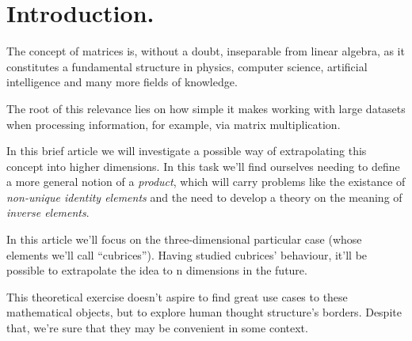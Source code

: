 \section{Introduction.} \label{intro}

The concept of matrices is, without a doubt, inseparable from linear algebra, as it constitutes a fundamental structure in physics, computer science, artificial intelligence and many more fields of knowledge.

The root of this relevance lies on how simple it makes working with large datasets when processing information, for example, via matrix multiplication.

In this brief article we will investigate a possible way of extrapolating this concept into higher dimensions. In this task we'll find ourselves needing to define a more general notion of a \textit{product}, which will carry problems like the existance of \textit{non-unique identity elements} and the need to develop a theory on the meaning of \textit{inverse elements}.

In this article we'll focus on the three-dimensional particular case (whose elements we'll call ``cubrices''). Having studied cubrices' behaviour, it'll be possible to extrapolate the idea to n dimensions in the future.

This theoretical exercise doesn't aspire to find great use cases to these mathematical objects, but to explore human thought structure's borders. Despite that, we're sure that they may be convenient in some context.
